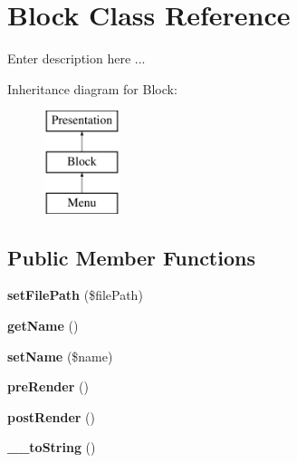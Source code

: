 \hypertarget{class_block}{
\section{Block Class Reference}
\label{class_block}
}


Enter description here ...  


Inheritance diagram for Block:\begin{figure}[H]
\begin{center}
\leavevmode
\includegraphics[height=3.000000cm]{class_block}
\end{center}
\end{figure}
\subsection*{Public Member Functions}
\begin{DoxyCompactItemize}
\item 
\hypertarget{class_block_ac0e681d42995f199f223531b4c5c64f5}{
{\bfseries setFilePath} (\$filePath)}
\label{class_block_ac0e681d42995f199f223531b4c5c64f5}

\item 
\hypertarget{class_block_ab688f834d8e7499b5703da5d02439ac2}{
{\bfseries getName} ()}
\label{class_block_ab688f834d8e7499b5703da5d02439ac2}

\item 
\hypertarget{class_block_a4f668c9ab980af2d31b21193239e4869}{
{\bfseries setName} (\$name)}
\label{class_block_a4f668c9ab980af2d31b21193239e4869}

\item 
\hypertarget{class_block_aa1a65e3254c65194547d05b7ff6f7b2f}{
{\bfseries preRender} ()}
\label{class_block_aa1a65e3254c65194547d05b7ff6f7b2f}

\item 
\hypertarget{class_block_a9d8725b698f412eba4cf1895dbb42283}{
{\bfseries postRender} ()}
\label{class_block_a9d8725b698f412eba4cf1895dbb42283}

\item 
\hypertarget{class_block_ac1c96432aed85bf62e2f4c3aa546cf41}{
{\bfseries \_\-\_\-toString} ()}
\label{class_block_ac1c96432aed85bf62e2f4c3aa546cf41}

\end{DoxyCompactItemize}
